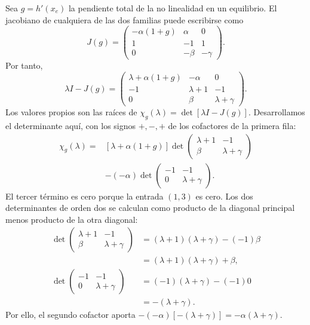 Sea \(g=h'(x_e)\) la pendiente total de la no linealidad en un equilibrio.
El jacobiano de cualquiera de las dos familias puede escribirse como
\begin{equation}
J(g)=
\begin{pmatrix}
-\alpha(1+g)&\alpha&0\\
1&-1&1\\
0&-\beta&-\gamma
\end{pmatrix}.
\label{eq:jacobiano_pendiente_total}
\end{equation}
Por tanto,
\[
\lambda I-J(g)=
\begin{pmatrix}
\lambda+\alpha(1+g)&-\alpha&0\\
-1&\lambda+1&-1\\
0&\beta&\lambda+\gamma
\end{pmatrix}.
\]
Los valores propios son las raíces de
\(\chi_g(\lambda)=\det[\lambda I-J(g)]\). Desarrollamos el determinante
aquí, con los signos \(+,-,+\) de los cofactores de la primera fila:
\begin{align*}
\chi_g(\lambda)
={}&[\lambda+\alpha(1+g)]
\det\begin{pmatrix}\lambda+1&-1\\\beta&\lambda+\gamma\end{pmatrix}\\
&-(-\alpha)
\det\begin{pmatrix}-1&-1\\0&\lambda+\gamma\end{pmatrix}.
\end{align*}
El tercer término es cero porque la entrada \((1,3)\) es cero. Los dos
determinantes de orden dos se calculan como producto de la diagonal
principal menos producto de la otra diagonal:
\[
\begin{aligned}
\det\begin{pmatrix}\lambda+1&-1\\\beta&\lambda+\gamma\end{pmatrix}
&=(\lambda+1)(\lambda+\gamma)-(-1)\beta\\
&=(\lambda+1)(\lambda+\gamma)+\beta,\\[1mm]
\det\begin{pmatrix}-1&-1\\0&\lambda+\gamma\end{pmatrix}
&=(-1)(\lambda+\gamma)-(-1)0\\
&=-(\lambda+\gamma).
\end{aligned}
\]
Por ello, el segundo cofactor aporta
\(-(-\alpha)[-(\lambda+\gamma)]=-\alpha(\lambda+\gamma)\).
